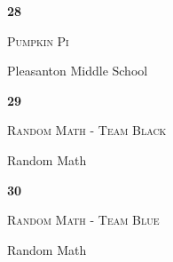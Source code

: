 \documentclass[extrafontsizes,30pt]{memoir}
\begin{document}
\begin{center}
\mbox{}
\vspace{1in}

{\Huge \textbf{ \TeamID}}

\vspace{1in}

{\Large \textsc{\TeamName}}

\vspace{1in}

{\large \SchoolName}
\end{center}

\newpage



\renewcommand{\TeamID}{28}
\renewcommand{\TeamName}{Pumpkin Pi}
\renewcommand{\SchoolName}{Pleasanton Middle School}

\begin{center}
\mbox{}
\vspace{1in}

{\Huge \textbf{ \TeamID}}

\vspace{1in}

{\Large \textsc{\TeamName}}

\vspace{1in}

{\large \SchoolName}
\end{center}

\newpage



\renewcommand{\TeamID}{29}
\renewcommand{\TeamName}{Random Math - Team Black}
\renewcommand{\SchoolName}{Random Math}

\begin{center}
\mbox{}
\vspace{1in}

{\Huge \textbf{ \TeamID}}

\vspace{1in}

{\Large \textsc{\TeamName}}

\vspace{1in}

{\large \SchoolName}
\end{center}

\newpage



\renewcommand{\TeamID}{30}
\renewcommand{\TeamName}{Random Math - Team Blue}
\renewcommand{\SchoolName}{Random Math}

\begin{center}
\mbox{}
\vspace{1in}

{\Huge \textbf{ \TeamID}}

\vspace{1in}

{\Large \textsc{\TeamName}}

\vspace{1in}

{\large \SchoolName}
\end{center}
\end{document}
